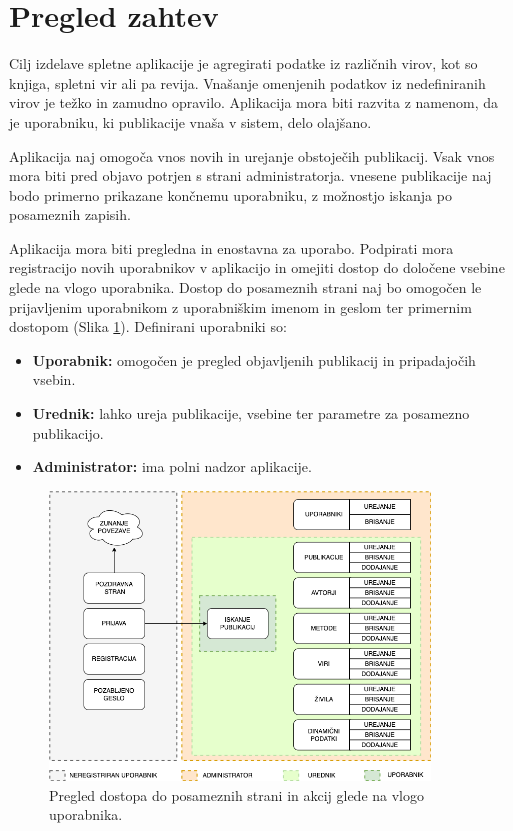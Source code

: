 \section{Pregled zahtev}
Cilj izdelave spletne aplikacije je agregirati podatke iz različnih virov, kot so knjiga, spletni vir ali pa revija. Vnašanje omenjenih podatkov iz nedefiniranih virov je težko in zamudno opravilo. Aplikacija mora biti razvita z namenom, da je uporabniku, ki publikacije vnaša v sistem, delo olajšano.

Aplikacija naj omogoča vnos novih in urejanje obstoječih publikacij. Vsak vnos mora biti pred objavo potrjen s strani administratorja. vnesene publikacije naj bodo primerno prikazane končnemu uporabniku, z možnostjo iskanja po posameznih zapisih.


Aplikacija mora biti pregledna in enostavna za uporabo. Podpirati mora registracijo novih uporabnikov v aplikacijo in omejiti dostop do določene vsebine glede na vlogo uporabnika. Dostop do posameznih strani naj bo omogočen le prijavljenim uporabnikom z uporabniškim imenom in geslom ter primernim dostopom (Slika \ref{user-rights}). Definirani uporabniki so:
\begin{itemize}
\item \textbf{Uporabnik:} omogočen je pregled objavljenih publikacij in pripadajočih vsebin.
\item \textbf{Urednik:} lahko ureja publikacije, vsebine ter parametre za posamezno publikacijo.
\item \textbf{Administrator:} ima polni nadzor aplikacije.
\end{itemize}

\begin{figure}[h]
\begin{center}
\includegraphics[width=0.9\textwidth]{slike/user_hierarchy.png}
\end{center}
\caption{ Pregled dostopa do posameznih strani in akcij glede na vlogo uporabnika. }
\label{user-rights}
\end{figure}

